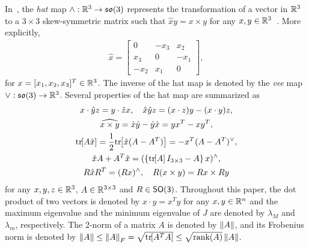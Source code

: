 \documentclass[fleqn]{IJCAS}  %
\begin{document}
\begin{multicols}{2}
In~, the \textit{hat} map $\wedge :\mathbb{R}^{3}\rightarrow\mathfrak{so}(3)$ represents the transformation of a vector in $\mathbb{R}^{3}$ to a $3\times 3$ skew-symmetric matrix such that $\hat x y = x\times y$ for any $x,y\in\mathbb{R}^{3}$~\cite{bullo2004}. 
More explicitly,
\begin{align*}
    \hat x = \begin{bmatrix} 0 & -x_3 & x_2 \\ x_3 & 0 & -x_1 \\ -x_2 & x_1 & 0\end{bmatrix},
\end{align*}
for $x=[x_1,x_2,x_3]^T\in\mathbb{R}^{3}$. 
The inverse of the hat map is denoted by the \textit{vee} map $\vee:\mathfrak{so}(3)\rightarrow\mathbb{R}^{3}$. 
Several properties of the hat map are summarized as
\begin{gather}
    x\cdot \hat y z = y\cdot \hat z x,\quad \hat x\hat y z = (x\cdot z) y - (x\cdot y ) z\label{eqn:STP},\\
    \widehat{x\times y} = \hat x \hat y -\hat y \hat x = yx^T-xy^T,\label{eqn:hatxy}\\
    \mathrm{tr}\negthickspace\left[ A\hat x  \right]=\frac{1}{2}\mathrm{tr}\negthickspace\left[ \hat x (A-A^T) \right]=-x^T (A-A^T)^\vee,\label{eqn:hat1}\\
    \hat x  A+A^T\hat x=(\left\{ \mathrm{tr}\negthickspace\left[ A \right]I_{3\times 3}-A \right\}x)^{\wedge}, \label{eqn:xAAx} \\
    R\hat x R^T = (Rx)^\wedge,\quad 
    R(x\times y) = Rx\times Ry\label{eqn:RxR}
\end{gather}
for any $x,y,z\in\mathbb{R}^{3}$, $A\in\mathbb{R}^{3\times 3}$ and $R\in\mathsf{SO(3)}$. 
Throughout this paper, the dot product of two vectors is denoted by $x\cdot y = x^T y$ for any $x,y\in\mathbb{R}^n$ and the maximum eigenvalue and the minimum eigenvalue of $J$ are denoted by $\lambda_M$ and $\lambda_m$, respectively. 
The 2-norm of a matrix \( A \) is denoted by \( \left\| A \right\| \), and its Frobenius norm is denoted by \( \left\| A \right\| \leq \left\| A \right\|_F = \sqrt{\mathrm{tr}\negthickspace\left[ A^T A \right]} \leq \sqrt{\text{rank}(A)} \left\| A \right\| \).


\end{multicols}
\end{document}
